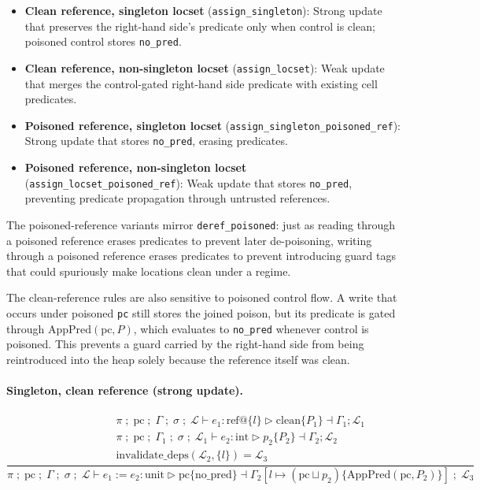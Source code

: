 \documentclass[12pt]{article}
\begin{document}
\begin{itemize}
    \item \textbf{Clean reference, singleton locset} (\texttt{assign\_singleton}): Strong update that preserves the right-hand side's predicate only when control is clean; poisoned control stores \texttt{no\_pred}.
    \item \textbf{Clean reference, non-singleton locset} (\texttt{assign\_locset}): Weak update that merges the control-gated right-hand side predicate with existing cell predicates.
    \item \textbf{Poisoned reference, singleton locset} (\texttt{assign\_singleton\_poisoned\_ref}): Strong update that stores \texttt{no\_pred}, erasing predicates.
    \item \textbf{Poisoned reference, non-singleton locset} (\texttt{assign\_locset\_poisoned\_ref}): Weak update that stores \texttt{no\_pred}, preventing predicate propagation through untrusted references.
\end{itemize}

The poisoned-reference variants mirror \texttt{deref\_poisoned}: just as reading through
a poisoned reference erases predicates to prevent later de-poisoning, writing through
a poisoned reference erases predicates to prevent introducing guard tags that could
spuriously make locations clean under a regime.

The clean-reference rules are also sensitive to poisoned control flow. A write
that occurs under poisoned \texttt{pc} still stores the joined poison, but its predicate
is gated through $\mathrm{AppPred}(\text{pc}, P)$, which evaluates to \texttt{no\_pred}
whenever control is poisoned. This prevents a guard carried by the right-hand side
from being reintroduced into the heap solely because the reference itself was clean.

\paragraph{Singleton, clean reference (strong update).}
\[
\frac{\begin{array}{c}
\pi \; ;\; \text{pc} \; ;\; \Gamma \; ;\; \sigma \; ;\; \mathcal{L} \vdash e_1 : \text{ref} @ \{l\} \triangleright \text{clean} \{ P_1 \} \dashv \Gamma_1 ; \mathcal{L}_1 \\
\pi \; ;\; \text{pc} \; ;\; \Gamma_1 \; ;\; \sigma \; ;\; \mathcal{L}_1 \vdash e_2 : \text{int} \triangleright p_2 \{ P_2 \} \dashv \Gamma_2 ; \mathcal{L}_2 \\
\text{invalidate\_deps}(\mathcal{L}_2, \{l\}) = \mathcal{L}_3
\end{array}}
{\pi \; ;\; \text{pc} \; ;\; \Gamma \; ;\; \sigma \; ;\; \mathcal{L} \vdash e_1 := e_2 : \text{unit} \triangleright \text{pc} \{ \text{no\_pred} \} \dashv \Gamma_2[l \mapsto (\text{pc} \sqcup p_2) \{ \mathrm{AppPred}(\text{pc}, P_2) \}] \; ;\; \mathcal{L}_3}
\]
\end{document}
